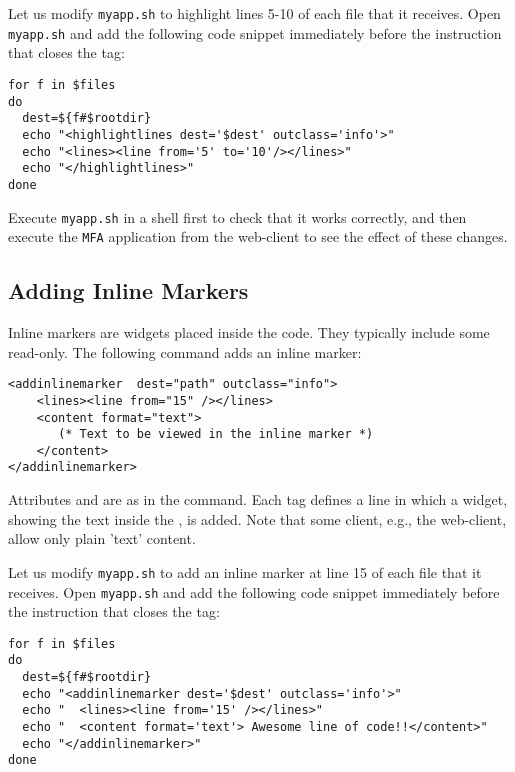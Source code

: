Let us modify \texttt{myapp.sh} to highlight lines 5-10 of each file
that it receives. Open \texttt{myapp.sh} and add the following code
snippet immediately before the instruction that closes the
 tag:

\medskip
\begin{lstlisting}[style=script]
for f in $files 
do
  dest=${f#$rootdir}
  echo "<highlightlines dest='$dest' outclass='info'>"
  echo "<lines><line from='5' to='10'/></lines>"
  echo "</highlightlines>"
done
\end{lstlisting}

\medskip
\noindent
Execute \texttt{myapp.sh} in a shell first to check that it works
correctly, and then execute the \texttt{MFA} application from the
web-client to see the effect of these changes.

\subsection{Adding Inline Markers}

Inline markers are widgets placed inside the code. They typically
include some read-only. The following command adds an inline marker:

\medskip
\begin{lstlisting}
<addinlinemarker  dest="path" outclass="info"> 
    <lines><line from="15" /></lines>
    <content format="text">
       (* Text to be viewed in the inline marker *)
    </content>
</addinlinemarker>
\end{lstlisting}

\medskip
\noindent
Attributes  and  are as in the 
command. Each  tag defines a line in which a widget, showing
the text inside the , is added. Note that some client,
e.g., the web-client, allow only plain 'text' content.

Let us modify \texttt{myapp.sh} to add an inline marker at line 15 of
each file that it receives. Open \texttt{myapp.sh} and add the
following code snippet immediately before the instruction that closes
the  tag:

\medskip
\begin{lstlisting}[style=script]for f in $files 
do
  dest=${f#$rootdir}
  echo "<addinlinemarker dest='$dest' outclass='info'>"
  echo "  <lines><line from='15' /></lines>"
  echo "  <content format='text'> Awesome line of code!!</content>"
  echo "</addinlinemarker>"
done
\end{lstlisting}

